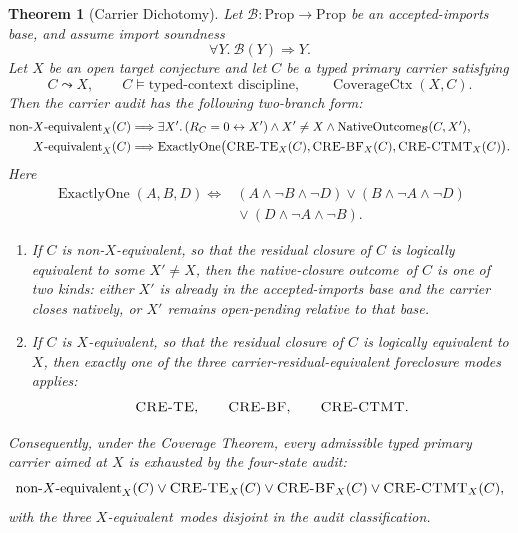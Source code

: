 \documentclass[11pt]{article}
\newcommand{\Xequiv}{$X$-equivalent}
\newcommand{\nonXequiv}{non-$X$-equivalent}
\newcommand{\CRETE}{\textsc{CRE-TE}}
\newcommand{\CREBF}{\textsc{CRE-BF}}
\newcommand{\CRECTMT}{\textsc{CRE-CTMT}}
\newcommand{\NativeClosure}{native-closure outcome}
\newcommand{\TCD}{typed-context discipline}
\newtheorem{theorem}{Theorem}[section]
\theoremstyle{definition}
\begin{document}
\begin{theorem}[Carrier Dichotomy]\label{thm:carrier-dichotomy}
Let \(\mathcal B:\mathrm{Prop}\to\mathrm{Prop}\) be an
accepted-imports base, and assume import soundness
\[
  \forall Y.\ \mathcal B(Y)\Longrightarrow Y .
\]
Let \(X\) be an open target conjecture and let \(C\) be a typed primary
carrier satisfying
\[
  C\leadsto X,\qquad C\models\text{\TCD},\qquad
  \operatorname{CoverageCtx}(X,C).
\]
Then the carrier audit has the following two-branch form:
\[
\begin{aligned}
  \mbox{\nonXequiv}_X(C)
  &\Longrightarrow
    \exists X'.\,
      (R_C=0\leftrightarrow X')\wedge X'\neq X\wedge
      \operatorname{NativeOutcome}_{\mathcal B}(C,X'),\\
  \mbox{\Xequiv}_X(C)
  &\Longrightarrow
    \operatorname{ExactlyOne}\bigl(
      \mbox{\CRETE}_X(C),\mbox{\CREBF}_X(C),\mbox{\CRECTMT}_X(C)
    \bigr).
\end{aligned}
\]
Here
\[
\begin{aligned}
\operatorname{ExactlyOne}(A,B,D)
  \Longleftrightarrow{}&
  (A\wedge\neg B\wedge\neg D)\vee
  (B\wedge\neg A\wedge\neg D)\\
  &{}\vee(D\wedge\neg A\wedge\neg B).
\end{aligned}
\]

\begin{enumerate}
\item If \(C\) is \nonXequiv, so that the residual closure of \(C\) is
  logically equivalent to some \(X'\neq X\), then the
  \NativeClosure\ of \(C\) is one of two kinds: either \(X'\) is
  already in the accepted-imports base and the carrier closes natively,
  or \(X'\) remains open-pending relative to that base.
\item If \(C\) is \Xequiv, so that the residual closure of \(C\) is
  logically equivalent to \(X\), then exactly one of the three
  carrier-residual-equivalent foreclosure modes applies:
  \[
    \textup{\CRETE},\qquad \textup{\CREBF},\qquad \textup{\CRECTMT}.
  \]
\end{enumerate}

Consequently, under the Coverage Theorem, every admissible typed
primary carrier aimed at \(X\) is exhausted by the four-state audit:
\[
  \mbox{\nonXequiv}_X(C)\vee
  \mbox{\CRETE}_X(C)\vee
  \mbox{\CREBF}_X(C)\vee
  \mbox{\CRECTMT}_X(C),
\]
with the three
\Xequiv\ modes disjoint in the audit classification.
\end{theorem}
\end{document}
